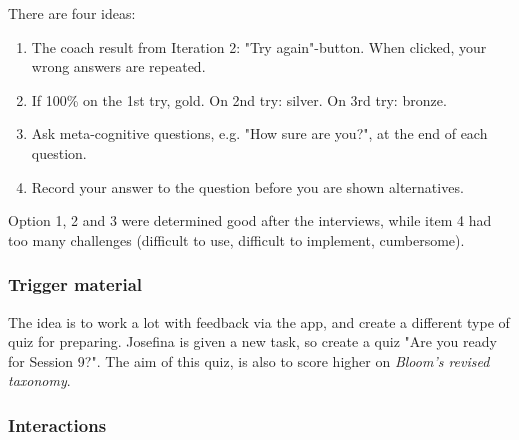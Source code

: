There are four ideas:

\begin{enumerate}
\item The coach result from Iteration 2: "Try again"-button. When clicked, your wrong answers are repeated.
\item If 100\% on the 1st try, gold. On 2nd try: silver. On 3rd try: bronze.
\item Ask meta-cognitive questions, e.g. "How sure are you?", at the end of each question.
\item Record your answer to the question before you are shown alternatives.
\end{enumerate}

Option 1, 2 and 3 were determined good after the interviews, while item 4 had too many challenges (difficult to use, difficult to implement, cumbersome).

\subsubsection*{Trigger material}

The idea is to work a lot with feedback via the app, and create a different type of quiz for preparing. Josefina is given a new task, so create a quiz "Are you ready for Session 9?". The aim of this quiz, is also to score higher on \textit{Bloom's revised taxonomy}.

\subsubsection*{Interactions}


